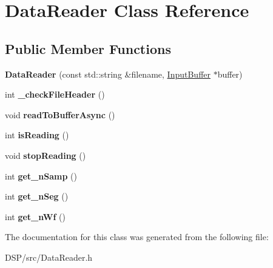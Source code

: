 \hypertarget{classDataReader}{\section{Data\-Reader Class Reference}
\label{classDataReader}
}
\subsection*{Public Member Functions}
\begin{DoxyCompactItemize}
\item 
\hypertarget{classDataReader_adba9892886eceb717d50ffc02bf8e2c2}{{\bfseries Data\-Reader} (const std\-::string \&filename, \hyperlink{classRingbuffer}{Input\-Buffer} $\ast$buffer)}\label{classDataReader_adba9892886eceb717d50ffc02bf8e2c2}

\item 
\hypertarget{classDataReader_aa53ed71dd3a6220e8f6d7d3f3db31ade}{int {\bfseries \-\_\-check\-File\-Header} ()}\label{classDataReader_aa53ed71dd3a6220e8f6d7d3f3db31ade}

\item 
\hypertarget{classDataReader_ae657eb3b65c75418f21ba9f03ac12b13}{void {\bfseries read\-To\-Buffer\-Async} ()}\label{classDataReader_ae657eb3b65c75418f21ba9f03ac12b13}

\item 
\hypertarget{classDataReader_a8a5bf454b34839d63e5d0c6ca7573682}{int {\bfseries is\-Reading} ()}\label{classDataReader_a8a5bf454b34839d63e5d0c6ca7573682}

\item 
\hypertarget{classDataReader_a4d153d457d8121a14386050a5a5618ce}{void {\bfseries stop\-Reading} ()}\label{classDataReader_a4d153d457d8121a14386050a5a5618ce}

\item 
\hypertarget{classDataReader_a8ada95ad5aca5fbb3e50f0b6a954a623}{int {\bfseries get\-\_\-n\-Samp} ()}\label{classDataReader_a8ada95ad5aca5fbb3e50f0b6a954a623}

\item 
\hypertarget{classDataReader_a94f681f6c77c9ad57c09b26fc367084b}{int {\bfseries get\-\_\-n\-Seg} ()}\label{classDataReader_a94f681f6c77c9ad57c09b26fc367084b}

\item 
\hypertarget{classDataReader_ad754d5ff3d2e833aaabf9460f47a77e4}{int {\bfseries get\-\_\-n\-Wf} ()}\label{classDataReader_ad754d5ff3d2e833aaabf9460f47a77e4}

\end{DoxyCompactItemize}


The documentation for this class was generated from the following file\-:\begin{DoxyCompactItemize}
\item 
D\-S\-P/src/Data\-Reader.\-h\end{DoxyCompactItemize}
